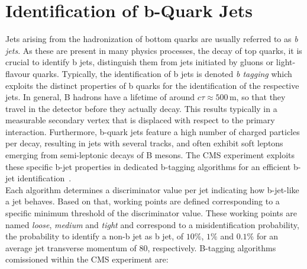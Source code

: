 \section{Identification of b-Quark Jets}
\label{sec:btagging}
Jets arising from the hadronization of bottom quarks are usually referred to as \textit{b jets}. As these are present in many physics processes, \eg the decay of top quarks, it is crucial to identify b jets, \ie distinguish them from jets initiated by gluons or light-flavour quarks. Typically, the identification of b jets is denoted \textit{b tagging} which exploits the distinct properties of b quarks for the identification of the respective jets. In general, B hadrons have a lifetime of around $c\tau \approx 500$\,\textmu m, so that they travel in the detector before they actually decay. This results typically in a measurable secondary vertex that is displaced with respect to the primary interaction. Furthermore, b-quark jets feature a high number of charged particles per decay, resulting in jets with several tracks, and often exhibit soft leptons emerging from semi-leptonic decays of B mesons. The CMS experiment exploits these specific b-jet properties in dedicated b-tagging algorithms for an efficient b-jet identification~\cite{Chatrchyan:2012jua}. \\
Each algorithm determines a discriminator value per jet indicating how b-jet-like a jet behaves. Based on that, working points are defined corresponding to a specific minimum threshold of the discriminator value. These working points are named \textit{loose}, \textit{medium} and \textit{tight} and correspond to a misidentification probability, \ie the probability to identify a non-b jet as b jet, of $10\%$, $1\%$ and $0.1\%$ for an average jet transverse momentum of $80$\gev, respectively. B-tagging algorithms comissioned within the CMS experiment are:

